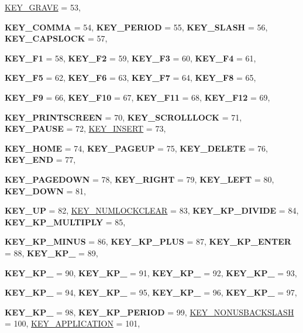 \begin{DoxyCompactItemize}
\hyperlink{classMezzanine_1_1MetaCode_a3b5633f0145bf3287cf53a3f05b5563cac09a9343ad1a7c1833450656a354b937}{KEY\_\-GRAVE} =  53, 
\par
{\bfseries KEY\_\-COMMA} =  54, 
{\bfseries KEY\_\-PERIOD} =  55, 
{\bfseries KEY\_\-SLASH} =  56, 
{\bfseries KEY\_\-CAPSLOCK} =  57, 
\par
{\bfseries KEY\_\-F1} =  58, 
{\bfseries KEY\_\-F2} =  59, 
{\bfseries KEY\_\-F3} =  60, 
{\bfseries KEY\_\-F4} =  61, 
\par
{\bfseries KEY\_\-F5} =  62, 
{\bfseries KEY\_\-F6} =  63, 
{\bfseries KEY\_\-F7} =  64, 
{\bfseries KEY\_\-F8} =  65, 
\par
{\bfseries KEY\_\-F9} =  66, 
{\bfseries KEY\_\-F10} =  67, 
{\bfseries KEY\_\-F11} =  68, 
{\bfseries KEY\_\-F12} =  69, 
\par
{\bfseries KEY\_\-PRINTSCREEN} =  70, 
{\bfseries KEY\_\-SCROLLLOCK} =  71, 
{\bfseries KEY\_\-PAUSE} =  72, 
\hyperlink{classMezzanine_1_1MetaCode_a3b5633f0145bf3287cf53a3f05b5563ca68b4c9fab606ba7faec021605586da3c}{KEY\_\-INSERT} =  73, 
\par
{\bfseries KEY\_\-HOME} =  74, 
{\bfseries KEY\_\-PAGEUP} =  75, 
{\bfseries KEY\_\-DELETE} =  76, 
{\bfseries KEY\_\-END} =  77, 
\par
{\bfseries KEY\_\-PAGEDOWN} =  78, 
{\bfseries KEY\_\-RIGHT} =  79, 
{\bfseries KEY\_\-LEFT} =  80, 
{\bfseries KEY\_\-DOWN} =  81, 
\par
{\bfseries KEY\_\-UP} =  82, 
\hyperlink{classMezzanine_1_1MetaCode_a3b5633f0145bf3287cf53a3f05b5563ca7539840a607d5aa419425f2038170212}{KEY\_\-NUMLOCKCLEAR} =  83, 
{\bfseries KEY\_\-KP\_\-DIVIDE} =  84, 
{\bfseries KEY\_\-KP\_\-MULTIPLY} =  85, 
\par
{\bfseries KEY\_\-KP\_\-MINUS} =  86, 
{\bfseries KEY\_\-KP\_\-PLUS} =  87, 
{\bfseries KEY\_\-KP\_\-ENTER} =  88, 
{\bfseries KEY\_\-KP\_} =  89, 
\par
{\bfseries KEY\_\-KP\_} =  90, 
{\bfseries KEY\_\-KP\_} =  91, 
{\bfseries KEY\_\-KP\_} =  92, 
{\bfseries KEY\_\-KP\_} =  93, 
\par
{\bfseries KEY\_\-KP\_} =  94, 
{\bfseries KEY\_\-KP\_} =  95, 
{\bfseries KEY\_\-KP\_} =  96, 
{\bfseries KEY\_\-KP\_} =  97, 
\par
{\bfseries KEY\_\-KP\_} =  98, 
{\bfseries KEY\_\-KP\_\-PERIOD} =  99, 
\hyperlink{classMezzanine_1_1MetaCode_a3b5633f0145bf3287cf53a3f05b5563ca6df6ef2f4f87cd863635313a7c73ded2}{KEY\_\-NONUSBACKSLASH} =  100, 
\hyperlink{classMezzanine_1_1MetaCode_a3b5633f0145bf3287cf53a3f05b5563cadf18e2b561df830d520652a79271f677}{KEY\_\-APPLICATION} =  101, 

\end{DoxyCompactItemize}
